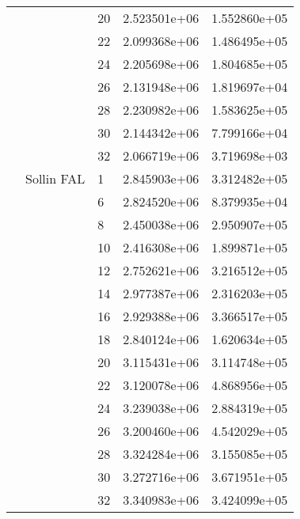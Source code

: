 \begin{tabular}{lllrr}
                      &            & 20 &  2.523501e+06 &  1.552860e+05 \\
                      &            & 22 &  2.099368e+06 &  1.486495e+05 \\
                      &            & 24 &  2.205698e+06 &  1.804685e+05 \\
                      &            & 26 &  2.131948e+06 &  1.819697e+04 \\
                      &            & 28 &  2.230982e+06 &  1.583625e+05 \\
                      &            & 30 &  2.144342e+06 &  7.799166e+04 \\
                      &            & 32 &  2.066719e+06 &  3.719698e+03 \\
                      & Sollin FAL & 1  &  2.845903e+06 &  3.312482e+05 \\
                      &            & 6  &  2.824520e+06 &  8.379935e+04 \\
                      &            & 8  &  2.450038e+06 &  2.950907e+05 \\
                      &            & 10 &  2.416308e+06 &  1.899871e+05 \\
                      &            & 12 &  2.752621e+06 &  3.216512e+05 \\
                      &            & 14 &  2.977387e+06 &  2.316203e+05 \\
                      &            & 16 &  2.929388e+06 &  3.366517e+05 \\
                      &            & 18 &  2.840124e+06 &  1.620634e+05 \\
                      &            & 20 &  3.115431e+06 &  3.114748e+05 \\
                      &            & 22 &  3.120078e+06 &  4.868956e+05 \\
                      &            & 24 &  3.239038e+06 &  2.884319e+05 \\
                      &            & 26 &  3.200460e+06 &  4.542029e+05 \\
                      &            & 28 &  3.324284e+06 &  3.155085e+05 \\
                      &            & 30 &  3.272716e+06 &  3.671951e+05 \\
                      &            & 32 &  3.340983e+06 &  3.424099e+05 \\
\bottomrule
\end{tabular}
